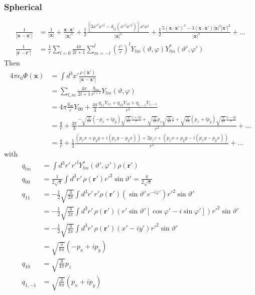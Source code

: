 \documentclass[../main.tex]{subfiles}
\begin{document}
\subsubsection{Spherical}
\begin{align}
\frac{1}{|\mathbf{x}-\mathbf{x}'|}
&=\frac{1}{|\mathbf{x}|}
+\frac{\mathbf{x}\cdot\mathbf{x}'}{|\mathbf{x}|^3}
+\frac{1}{2}\frac{[3x'^ix'^j-\delta_{ij}(x'^jx'^j)]x^ix^j}{|\mathbf{x}|^5}
+\frac{1}{2}\frac{5(\mathbf{x}\cdot\mathbf{x}')^3-3(\mathbf{x}\cdot\mathbf{x}')|\mathbf{x}|^2|\mathbf{x}'|^2}{|\mathbf{x}|^7}+...\\
\frac{1}{|\mathbf{r}-\mathbf{r}'|}
&=\frac{1}{r}\sum_{l=0}\frac{4\pi}{2l+1}\sum_{m=-l}^l\left(\frac{r'}{r}\right)^lY_{lm}(\vartheta,\varphi)Y^*_{lm}(\vartheta',\varphi')
\end{align}
Then
\begin{align}
4\pi\epsilon_0\Phi(\mathbf{x})
&=\int d^3x'\frac{\rho(\mathbf{x}')}{|\mathbf{x}-\mathbf{x}'|}\\
&=\sum_{l,m}\frac{4\pi}{2l+1}\frac{q_{lm}}{r^{l+1}}Y_{lm}(\vartheta,\varphi)\\
&=4\pi\frac{q_{00}}{r}Y_{00}+\frac{4\pi}{3}\frac{q_{11}Y_{11}+q_{10}Y_{10}+q_{1,-1}Y_{1,-1}}{r^2}\\
&=\frac{q}{r}+\frac{4\pi}{3}\frac{-\sqrt{\frac{3}{8\pi}}(-p_x+ip_y)\sqrt{\frac{3}{8\pi}}\frac{x+iy}{r}+\sqrt{\frac{3}{4\pi}}p_z\sqrt{\frac{3}{4\pi}}\frac{z}{r}
+\sqrt{\frac{3}{8\pi}}(p_x+ip_y)\sqrt{\frac{3}{8\pi}}\frac{x-iy}{r}}{r^2}+...\\
&=\frac{q}{r}+\frac{1}{2}\frac{(p_x x+p_y y+i(p_xy-p_yx))+2p_z z
+(p_x x+p_y y-i(p_xy-p_yx))}{r^3}+...
\end{align}
with
\begin{align}
q_{lm}&=\int d^3r'\,{r'}^lY^*_{lm}(\vartheta',\varphi')\rho(\mathbf{r}')\\
q_{00}&=\frac{1}{2\sqrt{\pi}}\int d^3r'\,\rho(\mathbf{r}')r'^2\sin\vartheta'=\frac{q}{2\sqrt{\pi}}\\
q_{11}&=-\frac{1}{2}\sqrt{\frac{3}{2\pi}}\int d^3r'\,r'\rho(\mathbf{r}')(\sin\vartheta'\,e^{-i\varphi'})r'^2\sin\vartheta'\\
&=-\frac{1}{2}\sqrt{\frac{3}{2\pi}}\int d^3r'\,\rho(\mathbf{r}')(r'\sin\vartheta'[\cos\varphi'-i\sin\varphi'])r'^2\sin\vartheta'\\
&=-\frac{1}{2}\sqrt{\frac{3}{2\pi}}\int d^3r'\,\rho(\mathbf{r}')(x'-iy')r'^2\sin\vartheta'\\
&=\sqrt{\frac{3}{8\pi}}(-p_x+ip_y)\\
q_{10}&=\sqrt{\frac{3}{4\pi}}p_z\\
q_{1,-1}&=\sqrt{\frac{3}{8\pi}}(p_x+ip_y)
\end{align}
\end{document}

